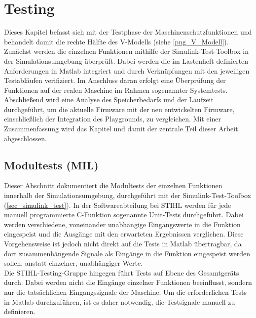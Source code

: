 \chapter{Testing}
\label{ch_testing}
Dieses Kapitel befasst sich mit der Testphase der Maschinenschutzfunktionen und behandelt damit die rechte Hälfte des V-Modells (siehe \autoref{png_V_Modell}). Zunächst werden die einzelnen Funktionen mithilfe der Simulink-Test-Toolbox in der Simulationsumgebung überprüft. Dabei werden die im Lastenheft definierten Anforderungen in Matlab integriert und durch Verknüpfungen mit den jeweiligen Testabläufen verifiziert. Im Anschluss daran erfolgt eine Überprüfung der Funktionen auf der realen Maschine im Rahmen sogenannter Systemtests. Abschließend wird eine Analyse des Speicherbedarfs und der Laufzeit durchgeführt, um die aktuelle Firmware mit der neu entwickelten Firmware, einschließlich der Integration des Playgrounds, zu vergleichen. Mit einer Zusammenfassung wird das Kapitel und damit der zentrale Teil dieser Arbeit abgeschlossen.

\section{Modultests (MIL)}
Dieser Abschnitt dokumentiert die Modultests der einzelnen Funktionen innerhalb der Simulationsumgebung, durchgeführt mit der Simulink-Test-Toolbox (\autoref{sec_simulink_test}). In der Softwareabteilung bei STIHL werden für jede manuell programmierte C-Funktion sogenannte Unit-Tests durchgeführt. Dabei werden verschiedene, voneinander unabhängige Eingangswerte in die Funktion eingespeist und die Ausgänge mit den erwarteten Ergebnissen verglichen. Diese Vorgehensweise ist jedoch nicht direkt auf die Tests in Matlab übertragbar, da dort zusammenhängende Signale als Eingänge in die Funktion eingespeist werden sollen, anstatt einzelner, unabhängiger Werte.\\
Die STIHL-Testing-Gruppe hingegen führt Tests auf Ebene des Gesamtgeräts durch. Dabei werden nicht die Eingänge einzelner Funktionen beeinflusst, sondern nur die tatsächlichen Eingangssignale der Maschine. Um die erforderlichen Tests in Matlab durchzuführen, ist es daher notwendig, die Testsignale manuell zu definieren. 
